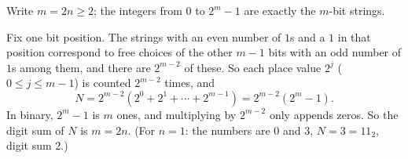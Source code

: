 Write $m=2n\ge2$; the integers from $0$ to $2^m-1$ are exactly the $m$-bit strings.

Fix one bit position. The strings with an even number of $1$s and a $1$ in that position correspond to free choices of the other $m-1$ bits with an odd number of $1$s among them, and there are $2^{m-2}$ of these. So each place value $2^j$ ($0\le j\le m-1$) is counted $2^{m-2}$ times, and
\[
N=2^{m-2}\left(2^0+2^1+\cdots+2^{m-1}\right)=2^{m-2}\left(2^m-1\right).
\]
In binary, $2^m-1$ is $m$ ones, and multiplying by $2^{m-2}$ only appends zeros. So the digit sum of $N$ is $m=\boxed{2n}$. (For $n=1$: the numbers are $0$ and $3$, $N=3=11_2$, digit sum $2$.)
